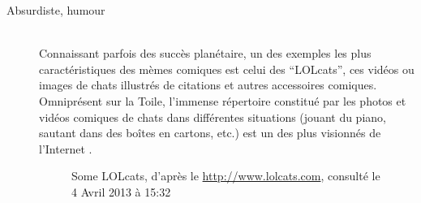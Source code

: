 \begin{description}

\item[Absurdiste, humour]
\hfill \\
Connaissant parfois des succès planétaire, un des exemples les plus caractéristiques des mèmes comiques est celui des {\textquotedblleft}LOLcats{\textquotedblright}, ces vidéos ou images de chats illustrés de citations et autres accessoires comiques. Omniprésent sur la Toile, l{\textquoteright}immense répertoire constitué par les photos et vidéos comiques de chats dans différentes situations (jouant du piano, sautant dans des bo\^ites en cartons, etc.) est un des plus visionnés de l{\textquoteright}Internet \citep{Bauckhage2011}.

\begin{figure}[htpb]
    \centering
    
    \caption[Some LOLcats]{Some LOLcats, d{\textquoteright}après le \url{http://www.lolcats.com}, consulté le 4 Avril 2013 à 15:32}
    \label{fig:lolcats}
\end{figure}




\end{description}
